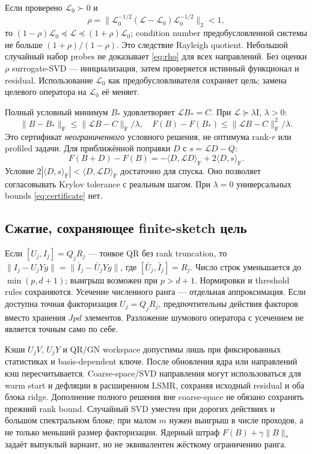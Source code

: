\documentclass[11pt,a4paper]{article}
\newcommand{\Id}{\mathrm I}
\newcommand{\F}{_{\mathrm F}}
\newcommand{\ip}[2]{\langle #1,#2\rangle_{\mathrm F}}
\begin{document}
Если проверено $\mathcal L_0\succ0$ и
\begin{equation}\label{eq:rho}
 \rho=\|\mathcal L_0^{-1/2}(\mathcal L-\mathcal L_0)
                    \mathcal L_0^{-1/2}\|_2<1,
\end{equation}
то $(1-\rho)\mathcal L_0\preceq\mathcal L\preceq(1+\rho)\mathcal L_0$;
condition number предобусловленной системы не больше
$(1+\rho)/(1-\rho)$. Это следствие Rayleigh quotient.
Небольшой случайный набор probes не доказывает \eqref{eq:rho} для всех
направлений. Без оценки $\rho$ surrogate-SVD --- инициализация, затем
проверяется истинный функционал и residual.
Использование $\mathcal L_0$ как предобусловливателя сохраняет цель;
замена целевого оператора на $\mathcal L_0$ её меняет.

Полный условный минимум $B_*$ удовлетворяет $\mathcal LB_*=C$.
При $\mathcal L\succeq\lambda\Id$, $\lambda>0$:
\begin{equation}\label{eq:certificate}
 \|B-B_*\|\F\le\|\mathcal LB-C\|\F/\lambda,
 \quad F(B)-F(B_*)\le\|\mathcal LB-C\|\F^2/\lambda.
\end{equation}
Это сертификат \emph{неограниченного} условного решения, не оптимума
rank-$r$ или profiled задачи. Для приближённой поправки $D$ с
$s=\mathcal LD-Q$:
\[
 F(B+D)-F(B)=-\ip{D}{\mathcal LD}+2\ip{D}{s}.
\]
Условие $2|\ip{D}{s}|<\ip{D}{\mathcal LD}$ достаточно для спуска.
Оно позволяет согласовывать Krylov tolerance с реальным шагом.
При $\lambda=0$ универсальных bounds \eqref{eq:certificate} нет.

\subsection{Сжатие, сохраняющее finite-sketch цель}
Если $[U_j,I_j]=Q_jR_j$ --- тонкое QR без rank truncation,
то $\|I_j-U_jYg\|=\|\bar I_j-\bar U_jYg\|$, где
$[\bar U_j,\bar I_j]=R_j$.
Число строк уменьшается до $\min(p,d+1)$;
выигрыш возможен при $p>d+1$. Нормировки и threshold rules сохраняются.
Усечение численного ранга --- отдельная аппроксимация.
Если доступна точная факторизация $U_j=Q_jR_j$, предпочтительны действия
факторов вместо хранения $Jpd$ элементов. Разложение шумового оператора
с усечением не является точным само по себе.

Кэши $U_jV$, $U_jY$ и QR/GN workspace допустимы лишь при фиксированных
статистиках и basis-dependent ключе. После обновления ядра или направлений
кэш пересчитывается. Coarse-space/SVD направления могут использоваться
для warm start и дефляции в расширенном LSMR, сохраняя исходный residual
и оба блока ridge. Дополнение полного решения вне coarse-space не обязано
сохранять прежний rank bound. Случайный SVD уместен при дорогих действиях
и большом спектральном блоке; при малом $m$ нужен выигрыш в числе проходов,
а не только меньший размер факторизации.
Ядерный штраф $F(B)+\gamma\|B\|_*$ задаёт выпуклый вариант,
но не эквивалентен жёсткому ограничению ранга.
\end{document}
